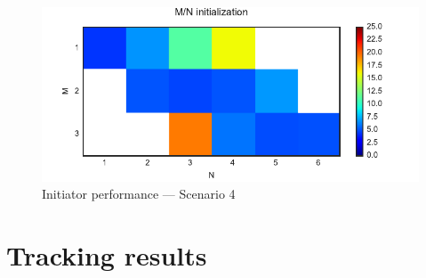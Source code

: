 \begin{figure}
 \centering
 \includegraphics{Figures/plots/Scenario4_Init-Performance.pdf}
 \caption{Initiator performance --- Scenario 4}\label{fig:init_performance_scenario4}
\end{figure}




\section{Tracking results}


